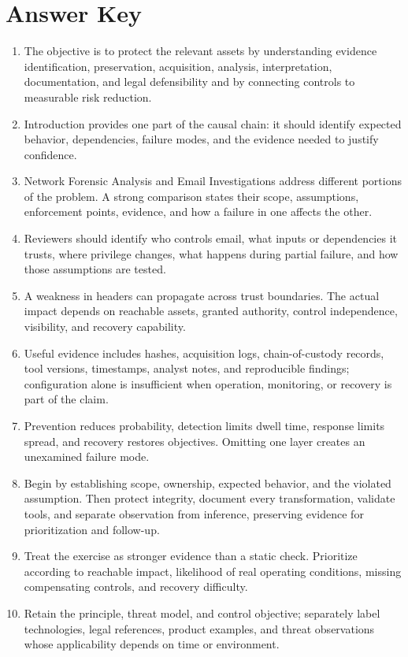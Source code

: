 \documentclass[11pt,letterpaper]{article}
\begin{document}
\section*{Answer Key}
\begin{enumerate}
\item The objective is to protect the relevant assets by understanding evidence identification, preservation, acquisition, analysis, interpretation, documentation, and legal defensibility and by connecting controls to measurable risk reduction.
\item Introduction provides one part of the causal chain: it should identify expected behavior, dependencies, failure modes, and the evidence needed to justify confidence.
\item Network Forensic Analysis and Email Investigations address different portions of the problem. A strong comparison states their scope, assumptions, enforcement points, evidence, and how a failure in one affects the other.
\item Reviewers should identify who controls email, what inputs or dependencies it trusts, where privilege changes, what happens during partial failure, and how those assumptions are tested.
\item A weakness in headers can propagate across trust boundaries. The actual impact depends on reachable assets, granted authority, control independence, visibility, and recovery capability.
\item Useful evidence includes hashes, acquisition logs, chain-of-custody records, tool versions, timestamps, analyst notes, and reproducible findings; configuration alone is insufficient when operation, monitoring, or recovery is part of the claim.
\item Prevention reduces probability, detection limits dwell time, response limits spread, and recovery restores objectives. Omitting one layer creates an unexamined failure mode.
\item Begin by establishing scope, ownership, expected behavior, and the violated assumption. Then protect integrity, document every transformation, validate tools, and separate observation from inference, preserving evidence for prioritization and follow-up.
\item Treat the exercise as stronger evidence than a static check. Prioritize according to reachable impact, likelihood of real operating conditions, missing compensating controls, and recovery difficulty.
\item Retain the principle, threat model, and control objective; separately label technologies, legal references, product examples, and threat observations whose applicability depends on time or environment.
\end{enumerate}
\end{document}
